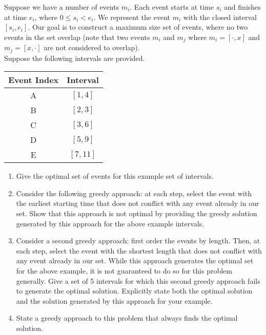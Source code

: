 \documentclass[9pt]{article}
\begin{document}
\item Suppose we have a number of events $m_{i}$. Each event starts at time $s_{i}$ and finishes at time $e_{i}$, where $0 \leq s_{i} < e_{i}$. We represent the event $m_{i}$ with the closed interval $[s_{i}, e_{i}].$ Our goal is to construct a maximum size set of events, where no two events in the set overlap (note that two events $m_{i}$ and $m_{j}$ where $m_{i} = [\cdot, x]$ and $m_{j} = [x, \cdot]$ are not considered to overlap). \\

Suppose the following intervals are provided.

\begin{center}
\begin{tabular}{c|c}
Event Index & Interval \\ \hline
A & $[1, 4]$ \\ 
B & $[2, 3]$ \\
C & $[3, 6]$ \\
D & $[5, 9]$ \\
E & $[7, 11]$
\end{tabular}
\end{center}

\begin{enumerate}

\item Give the optimal set of events for this example set of intervals.

\item Consider the following greedy approach: at each step, select the event with the earliest starting time that does not conflict with any event already in our set. Show that this approach is not optimal by providing the greedy solution generated by this approach for the above example intervals.

\item Consider a second greedy approach: first order the events by length. Then, at each step, select the event with the shortest length that does not conflict with any event already in our set. While this approach generates the optimal set for the above example, it is not guaranteed to do so for this problem generally. Give a set of 5 intervals for which this second greedy approach fails to generate the optimal solution. Explicitly state both the optimal solution and the solution generated by this approach for your example.

\item State a greedy approach to this problem that always finds the optimal solution.

\end{enumerate}
\end{document}
